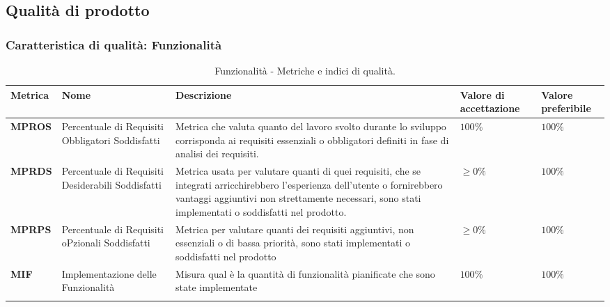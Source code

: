 \subsection{Qualità di prodotto}

\subsubsection{Caratteristica di qualità: Funzionalità}
\hspace{1pt}
    \begin{longtable}{|C{1.5cm}|L{3cm}|L{4cm}|L{2.5cm}|L{2.5cm}|}
        \hline
        \textbf{Metrica} & \textbf{Nome} & \textbf{Descrizione} & \textbf{Valore di accettazione} & \textbf{Valore preferibile} \\
        \hline
        \textbf{MPROS} & Percentuale di Requisiti Obbligatori Soddisfatti &  Metrica che valuta quanto del lavoro svolto durante lo sviluppo corrisponda ai requisiti essenziali o obbligatori definiti in fase di analisi dei requisiti.  & $ 100\%$  & $ 100\%$ \\
        \hline
        \textbf{MPRDS} & Percentuale di Requisiti Desiderabili Soddisfatti & Metrica usata per valutare quanti di quei requisiti, che se integrati arricchirebbero l'esperienza dell'utente o fornirebbero vantaggi aggiuntivi non strettamente necessari, sono stati implementati o soddisfatti nel prodotto. & $\geq 0\%$ & $100\%$ \\
        \hline
        \textbf{MPRPS} & Percentuale di Requisiti oPzionali Soddisfatti & Metrica per valutare quanti dei requisiti aggiuntivi, non essenziali o di bassa priorità, sono stati implementati o soddisfatti nel prodotto & $\geq 0\%$ & $100\%$ \\
        \hline
        \textbf{MIF} & Implementazione delle Funzionalità & Misura qual è la quantità di funzionalità pianificate che sono state implementate & $ 100\%$ & $ 100\%$ \\
        \hline
        \caption{Funzionalità - Metriche e indici di qualità.}
        \label{tab:metriche_funzionalità_testo}
    \end{longtable}

